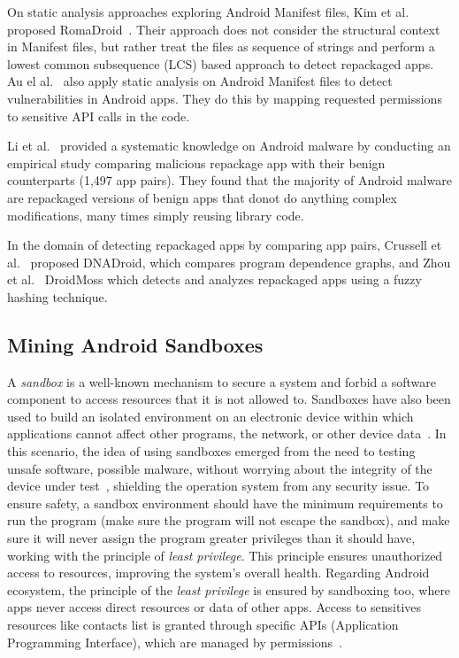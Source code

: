 On static analysis approaches exploring Android Manifest files, Kim et al. proposed RomaDroid~\cite{DBLP:journals/access/KimLCP19}.  Their approach does not consider the structural context in Manifest files, but rather treat the files as sequence of strings and perform a lowest common subsequence (LCS) based approach to detect repackaged apps. Au el al.~\cite{DBLP:conf/ccs/AuZHL12} also apply static analysis on Android Manifest files to detect vulnerabilities in Android apps. They do this by mapping requested permissions to sensitive API calls in the code.

Li et al.~\cite{DBLP:journals/tifs/0029LBKTLC17} provided a systematic knowledge on Android malware by conducting an empirical study comparing malicious repackage app with their benign counterparts (1,497 app pairs). They found that the majority of Android malware are repackaged versions of benign apps that donot do anything complex modifications, many times simply reusing library code.

In the domain of detecting repackaged apps by comparing app pairs, Crussell et al.~\cite{DBLP:conf/esorics/CrussellGC12} proposed  DNADroid, which compares program dependence graphs, and Zhou et al.~\cite{DBLP:conf/codaspy/ZhouZJN12} DroidMoss which detects and analyzes repackaged apps using a fuzzy hashing technique. 

\subsection{Mining Android Sandboxes}\label{sec:android-sandbox}

A \emph{sandbox}
is a well-known mechanism to secure a system and forbid a software component to access
resources that it is not allowed to. Sandboxes have also been used to build an isolated
environment on an electronic device within which applications cannot affect other programs, the network, or other device data~\cite{DBLP:journals/peerj-cs/MaassSCS16}. In this scenario, the idea of using sandboxes emerged from the
need to testing unsafe software, possible malware, without worrying about the integrity of the
device under test~\cite{DBLP:conf/esorics/BordoniCS17}, shielding the operation system from any security issue.
To ensure safety, a sandbox environment should have the minimum requirements to run the
program (make sure the program will not escape the sandbox), and make sure it will never
assign the program greater privileges than it should have, working with the principle of
\emph{least privilege}. This principle ensures unauthorized access to resources,
improving the system's overall health. Regarding Android ecosystem, the principle
of the \emph{least privilege} is ensured by sandboxing too,
where apps never access direct resources or data of other apps. Access to sensitives resources
like contacts list is granted through specific APIs (Application Programming Interface),
which are managed by permissions~\cite{DBLP:journals/corr/abs-2109-06613}. 

